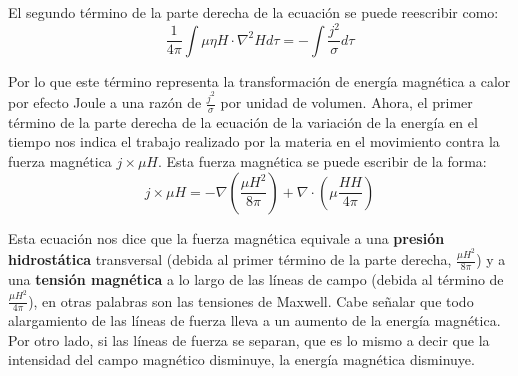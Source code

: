 El segundo término de la parte derecha de la ecuación se puede reescribir como:
\begin{equation}
\frac{1}{4\pi}\int \mu \eta H\cdot \nabla ^{2}Hd\tau=-\int \frac{j^{2}}{\sigma}d\tau
\end{equation}

Por lo que este término representa la transformación de energía magnética a calor por efecto Joule a una razón de $\frac{j^{2}}{\sigma}$ por unidad de volumen. Ahora, el primer término de la parte derecha de la ecuación de la variación de la energía en el tiempo nos indica el trabajo realizado por la materia en el movimiento contra la fuerza magnética $j\times \mu H$. Esta fuerza magnética se puede escribir de la forma:
\begin{equation}
j\times \mu H=-\nabla\left( \frac{\mu H^{2}}{8\pi} \right)+\nabla \cdot\left( \mu  \frac{HH}{4\pi} \right)
\end{equation}

Esta ecuación nos dice que la fuerza magnética equivale a una \textbf{presión hidrostática} transversal (debida al primer término de la parte derecha, $\frac{\mu H^{2}}{8\pi}$) y a una \textbf{tensión magnética} a lo largo de las líneas de campo (debida al término de $\frac{\mu H^{2}}{4\pi}$), en otras palabras son las tensiones de Maxwell.
Cabe señalar que todo alargamiento de las líneas de fuerza lleva a un aumento de la energía magnética. Por otro lado, si las líneas de fuerza se separan, que es lo mismo a decir que la intensidad del campo magnético disminuye, la energía magnética disminuye.